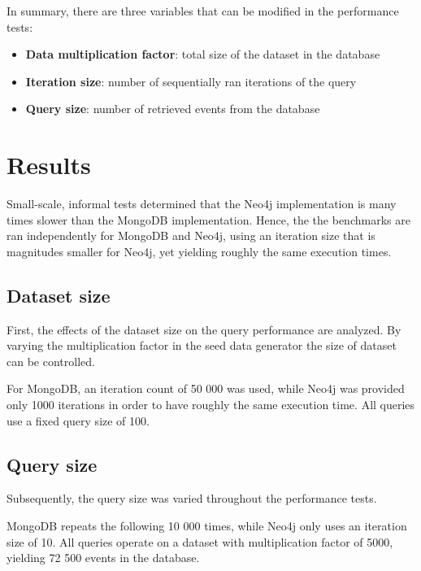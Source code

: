 In summary, there are three variables that can be modified in the performance tests:

\begin{itemize}
  \item \textbf{Data multiplication factor}: total size of the dataset in the database
  \item \textbf{Iteration size}: number of sequentially ran iterations of the query
  \item \textbf{Query size}: number of retrieved events from the database
\end{itemize}

\section{Results}
\label{sec:results}

Small-scale, informal tests determined that the Neo4j implementation is many times slower than the MongoDB implementation.
Hence, the the benchmarks are ran independently for MongoDB and Neo4j, using an iteration size that is magnitudes smaller for Neo4j, yet yielding roughly the same execution times.

\subsection{Dataset size}
\label{subsec:dataset-size}

First, the effects of the dataset size on the query performance are analyzed.
By varying the multiplication factor in the seed data generator the size of dataset can be controlled.

For MongoDB, an iteration count of 50 000 was used, while Neo4j was provided only 1000 iterations in order to have roughly the same execution time.
All queries use a fixed query size of 100.



\subsection{Query size}
\label{subsec:query-size}

Subsequently, the query size was varied throughout the performance tests.

MongoDB repeats the following 10 000 times, while Neo4j only uses an iteration size of 10.
All queries operate on a dataset with multiplication factor of 5000, yielding 72 500 events in the database.

